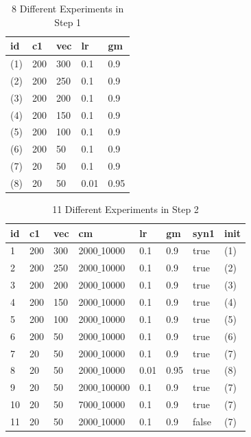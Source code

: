 \begin{table}[tb] 
\caption{8 Different Experiments in Step 1} \label{tab:experiment8}
\begin{center}
\begin{tabular}{|l|l|l|l|l|}
\hline
id&c1&vec&lr&gm \\ \hline
(1) 	&  200 		& 300  	& 0.1		& 0.9	\\ \hline
(2) 	&  200 		& 250  	& 0.1		& 0.9	\\ \hline
(3) 	&  200 		& 200  	& 0.1		& 0.9	\\ \hline
(4) 	&  200 		& 150  	& 0.1		& 0.9	\\ \hline
(5) 	&  200 		& 100  	& 0.1		& 0.9	\\ \hline
(6) 	&  200 		& 50 	& 0.1		& 0.9	\\ \hline
(7)	&  20		& 50	& 0.1		& 0.9	\\ \hline
(8)	&  20		& 50	& 0.01		& 0.95	\\ \hline
\end{tabular}
\end{center}
\end{table}


\begin{table}[tb]

\caption{11 Different Experiments in Step 2} \label{tab:experiment11}
\begin{center}
\begin{tabular}{|l|l|l|l|l|l|l|l|}
\hline
id&c1&vec&cm&lr&gm&syn1&init \\ \hline
1 	&  200 		& 300 	& 2000$\_$10000 	& 0.1		& 0.9	& true & (1)\\ \hline
2	&  200		& 250   & 2000$\_$10000 	& 0.1		& 0.9	& true & (2)\\ \hline
3	&  200		& 200   & 2000$\_$10000 	& 0.1		& 0.9	& true & (3)\\ \hline
4	&  200		& 150   & 2000$\_$10000 	& 0.1		& 0.9	& true & (4)\\ \hline
5 	&  200 		& 100 	& 2000$\_$10000 	& 0.1		& 0.9	& true & (5) \\ \hline
6 	&  200 		& 50 	& 2000$\_$10000 	& 0.1		& 0.9	& true & (6)\\ \hline
7	&  20		& 50	& 2000$\_$10000	& 0.1		& 0.9	& true & (7)\\ \hline
8	&  20		& 50	& 2000$\_$10000	& 0.01		& 0.95	& true & (8)\\ \hline
9 	&  20		& 50 	& 2000$\_$100000 	& 0.1		& 0.9	& true & (7)\\ \hline
10 	&  20		& 50 	& 7000$\_$10000 	& 0.1		& 0.9	& true & (7)\\ \hline
11 	&  20		& 50 	& 2000$\_$10000 	& 0.1		& 0.9	& false& (7)\\ \hline
\end{tabular}

\end{center}
\end{table}

